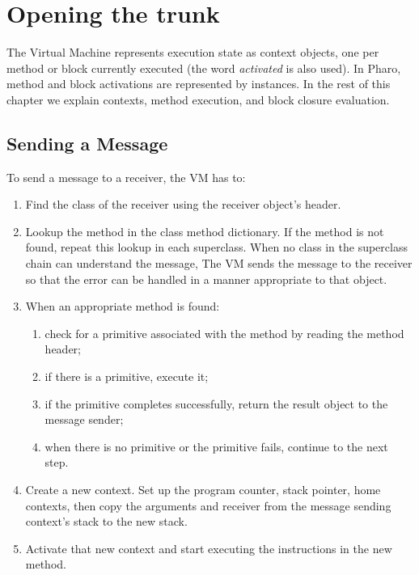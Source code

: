 \documentclass[a4paper,10pt,twoside]{book}
\begin{document}
\section{Opening the trunk}

The Virtual Machine represents execution state as context objects, one per method or block currently executed (the word \emph{activated} is also used). In Pharo, method and block activations are represented by  instances.
In the rest of this chapter we explain contexts, method execution, and block closure evaluation.

\subsection{Sending a Message}

To send a message to a receiver, the VM has to:

\begin{enumerate}

\item Find the class of the receiver using the receiver object's
  header.

\item Lookup the method in the class method dictionary. If the method
  is not found, repeat this lookup in each superclass. When no class
  in the superclass chain can understand the message, The VM sends the
  message  to the receiver so that the error
  can be handled in a manner appropriate to that object.

\item When an appropriate method is found:

  \begin{enumerate}
  \item check for a primitive associated with the method by reading
    the method header;
  \item if there is a primitive, execute it;
  \item if the primitive completes successfully, return the result object
    to the message sender;
  \item when there is no primitive or the primitive fails, continue to
    the next step.
  \end{enumerate}

\item Create a new context. Set up the program counter, stack pointer,
  home contexts, then copy the arguments and receiver from the message
  sending context's stack to the new stack.

\item Activate that new context and start executing the instructions
  in the new method.
\end{enumerate}
\end{document}
